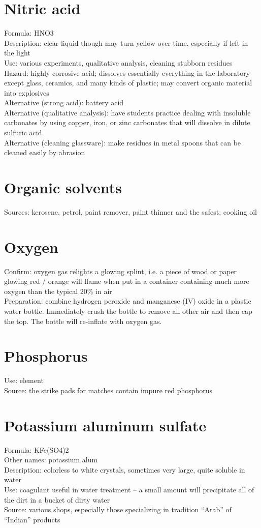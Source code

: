\section{Nitric acid}
Formula: HNO3\\
Description: clear liquid though may turn yellow over time, 
especially if left in the light\\
Use: various experiments, 
qualitative analysis, 
cleaning stubborn residues\\
Hazard: highly corrosive acid; 
dissolves essentially everything in the laboratory except glass, 
ceramics, 
and many kinds of plastic; 
may convert organic material into explosives\\
Alternative (strong acid): battery acid\\
Alternative (qualitative analysis): 
have students practice dealing with insoluble carbonates by using copper, 
iron, 
or zinc carbonates that will dissolve in dilute sulfuric acid\\
Alternative (cleaning glassware): 
make residues in metal spoons that can be cleaned easily by abrasion

\section{Organic solvents}
Sources: kerosene, 
petrol, 
paint remover, 
paint thinner and the safest: cooking oil

\section{Oxygen}
Confirm: oxygen gas relights a glowing splint, 
i.e. 
a piece of wood or paper glowing red / orange 
will flame when put in a container 
containing much more oxygen than the typical 20\% in air\\
Preparation: combine hydrogen peroxide 
and manganese (IV) oxide in a plastic water bottle. 
Immediately crush the bottle to remove all other air and then cap the top. 
The bottle will re-inflate with oxygen gas.

\section{Phosphorus}
Use: element\\
Source: the strike pads for matches contain impure red phosphorus

\section{Potassium aluminum sulfate}
Formula: KFe(SO4)2\\
Other names: potassium alum\\
Description: colorless to white crystals, 
sometimes very large, 
quite soluble in water\\
Use: coagulant useful in water treatment – 
a small amount will precipitate all of the dirt in a bucket of dirty water\\
Source: various shops, 
especially those specializing in tradition “Arab” of “Indian” products

